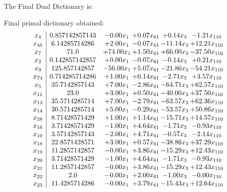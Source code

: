 \documentclass[8pt]{article}
\begin{document}
The Final Dual Dictionary is: 

 Final primal dictionary obtained: 
\[\begin{array}{c| c c@{\hskip 2pt} c@{\hskip 2pt} c@{\hskip 2pt} c@{\hskip 2pt} }
 x_{4}   &  0.857142857143 & -0.00 x_{1} & +  0.07 x_{61} & +  0.14 x_{3} & -1.21 x_{110}\\
 x_{45}   &  6.14285714286 & +  2.00 x_{1} & -0.07 x_{61} & -11.14 x_{3} & + 12.21 x_{110}\\
 x_{7}   &  71.0 & + 74.00 x_{1} & +  1.50 x_{61} & + 66.00 x_{3} & -37.50 x_{110}\\
 x_{2}   &  0.142857142857 & +  0.00 x_{1} & -0.07 x_{61} & -0.14 x_{3} & +  0.21 x_{110}\\
 x_{9}   &  125.857142857 & -56.00 x_{1} & +  5.07 x_{61} & -21.86 x_{3} & -54.21 x_{110}\\
 x_{74}   &  0.714285714286 & +  1.00 x_{1} & +  0.14 x_{61} & -2.71 x_{3} & +  3.57 x_{110}\\
 x_{5}   &  35.7142857143 & +  7.00 x_{1} & -2.86 x_{61} & -64.71 x_{3} & + 62.57 x_{110}\\
 x_{11}   &  23.0 & +  3.00 x_{1} & +  0.50 x_{61} & -40.00 x_{3} & + 37.50 x_{110}\\
 x_{13}   &  35.5714285714 & +  7.00 x_{1} & -2.79 x_{61} & -63.57 x_{3} & + 62.36 x_{110}\\
 x_{14}   &  30.5714285714 & +  5.00 x_{1} & -0.29 x_{61} & -53.57 x_{3} & + 50.86 x_{110}\\
 x_{28}   &  8.71428571429 & +  1.00 x_{1} & +  1.14 x_{61} & -15.71 x_{3} & + 14.57 x_{110}\\
 x_{16}   &  3.71428571429 & -1.00 x_{1} & +  4.64 x_{61} & -1.71 x_{3} & -0.93 x_{110}\\
 x_{10}   &  3.57142857143 & -2.00 x_{1} & +  4.71 x_{61} & -0.57 x_{3} & -2.14 x_{110}\\
 x_{18}   &  22.8571428571 & +  3.00 x_{1} & +  0.57 x_{61} & -38.86 x_{3} & + 37.29 x_{110}\\
 x_{19}   &  11.2857142857 & -0.00 x_{1} & +  3.86 x_{61} & -15.29 x_{3} & + 12.43 x_{110}\\
 x_{20}   &  3.71428571429 & -1.00 x_{1} & +  4.64 x_{61} & -1.71 x_{3} & -0.93 x_{110}\\
 x_{21}   &  11.2857142857 & -0.00 x_{1} & +  3.86 x_{61} & -15.29 x_{3} & + 12.43 x_{110}\\
 x_{22}   &  2.0 & -0.00 x_{1} & +  2.00 x_{61} & -1.00 x_{3} & -0.00 x_{110}\\
 x_{23}   &  11.4285714286 & -0.00 x_{1} & +  3.79 x_{61} & -15.43 x_{3} & + 12.64 x_{110}\\

\end{array}\]
\end{document}
